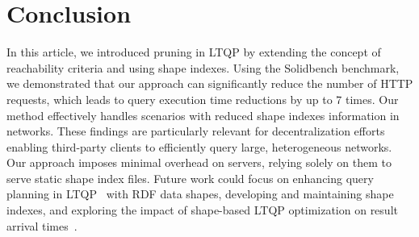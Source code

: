 \section{Conclusion}

In this article, we introduced pruning in LTQP by extending the concept of reachability criteria and using shape indexes.
Using the Solidbench benchmark, we demonstrated that our approach can significantly reduce the number of HTTP requests, which leads to query execution time reductions by up to 7 times.
Our method effectively handles scenarios with reduced shape indexes information in networks.
These findings are  particularly relevant for decentralization efforts enabling third-party clients to efficiently query large, heterogeneous networks.
Our approach imposes minimal overhead on servers, relying solely on them to serve static shape index files.
Future work could focus on enhancing query planning in LTQP~\cite{taelman2024towards} with RDF data shapes, developing and maintaining shape indexes, and exploring the impact of shape-based LTQP optimization on result arrival times~\cite{Acosta2017}.

